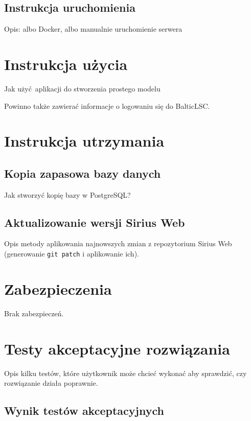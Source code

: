 \subsection{Instrukcja uruchomienia}

Opis: albo Docker, albo manualnie uruchomienie serwera

\section{Instrukcja użycia}

Jak użyć aplikacji do stworzenia prostego modelu

Powinno także zawierać informacje o logowaniu się do BalticLSC\@.

\section{Instrukcja utrzymania}

\subsection{Kopia zapasowa bazy danych}

Jak stworzyć kopię bazy w PostgreSQL\@?

\subsection{Aktualizowanie wersji Sirius Web}

Opis metody aplikowania najnowszych zmian z repozytorium Sirius Web
(generowanie \texttt{git patch} i aplikowanie ich).

\section{Zabezpieczenia}

Brak zabezpieczeń.

\section{Testy akceptacyjne rozwiązania}

Opis kilku testów, które użytkownik może chcieć wykonać aby sprawdzić, czy
rozwiązanie działa poprawnie.

\subsection{Wynik testów akceptacyjnych}

